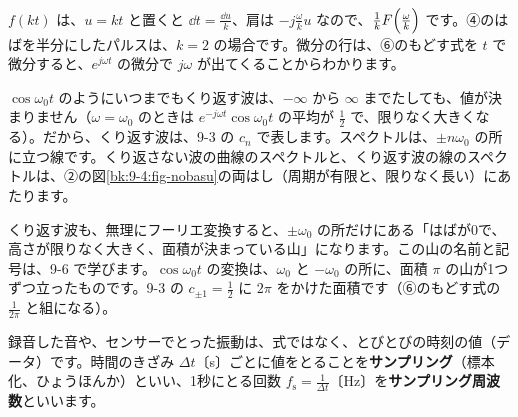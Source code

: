 $f(kt)$ は、$u=kt$ と置くと $\dd t=\tfrac{\dd u}{k}$、肩は $-j\tfrac{\omega}{k}u$ なので、$\tfrac{1}{k}F\Bigl(\tfrac{\omega}{k}\Bigr)$ です。④のはばを半分にしたパルスは、$k=2$ の場合です。微分の行は、⑥のもどす式を $t$ で微分すると、$e^{j\omega t}$ の微分で $j\omega$ が出てくることからわかります。


\label{bk:9-4:kurikaesu}$\cos\omega_0t$ のようにいつまでもくり返す波は、$-\infty$ から $\infty$ までたしても、値が決まりません（$\omega=\omega_0$ のときは $e^{-j\omega t}\cos\omega_0t$ の平均が $\frac12$ で、限りなく大きくなる）。だから、くり返す波は、9-3 の $c_n$ で表します。スペクトルは、$\pm n\omega_0$ の所に立つ線です。くり返さない波の曲線のスペクトルと、くり返す波の線のスペクトルは、②の図\ref{bk:9-4:fig-nobasu}の両はし（周期が有限と、限りなく長い）にあたります。

\begin{seikaku}
くり返す波も、無理にフーリエ変換すると、$\pm\omega_0$ の所だけにある「はばが0で、高さが限りなく大きく、面積が決まっている山」になります。この山の名前と記号は、9-6 で学びます。$\cos\omega_0t$ の変換は、$\omega_0$ と $-\omega_0$ の所に、面積 $\pi$ の山が1つずつ立ったものです。9-3 の $c_{\pm1}=\frac12$ に $2\pi$ をかけた面積です（⑥のもどす式の $\frac{1}{2\pi}$ と組になる）。
\end{seikaku}


\label{bk:9-4:dft}録音した音や、センサーでとった振動は、式ではなく、とびとびの時刻の値（データ）です。時間のきざみ $\Delta t$〔s〕ごとに値をとることを\textbf{サンプリング}（標本化、ひょうほんか）といい、1秒にとる回数 $f_{\mathrm s}=\tfrac{1}{\Delta t}$〔Hz〕を\textbf{サンプリング周波数}といいます。

